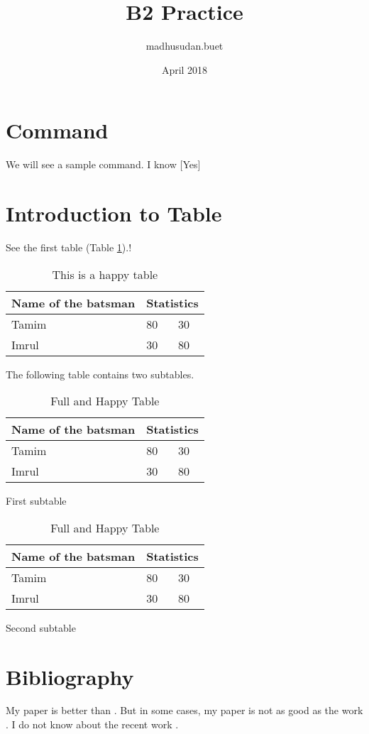 \documentclass{article}
\title{B2 Practice}
\author{madhusudan.buet }
\date{April 2018}
\begin{document}
\maketitle
\listoftables
\section{Command}
We will see a sample command. I know [Yes]
\section{Introduction to Table}
See the first table (Table \ref{tab:1}).! \newline
\begin{table}[h!]
\centering
\begin{tabular}{|| m{2cm} | m{2cm} | m{3cm} ||}
\hline
   Name of the batsman & \multicolumn{2}{c|}{Statistics}\\
   \hline
   \hline
   Tamim & 80 & 30\\
   \hline
   Imrul & 30 & 80\\
   \hline
\end{tabular}
\caption{This is a happy table}
\label{tab:1}
\end{table}

The following table contains two subtables. 
\begin{table}[]
\centering
    \begin{subtable}{0.7\textwidth}
    \centering
        \begin{tabular}{|| m{2cm} | m{2cm} | m{3cm} ||}
            \hline
            Name of the batsman & \multicolumn{2}{c|}{Statistics}\\
            \hline
           \hline
           Tamim & 80 & 30\\
           \hline
           Imrul & 30 & 80\\
           \hline
        \end{tabular}
        \caption{First subtable}
        \label{subtab:1}
    \end{subtable}
    \begin{subtable}{0.7\textwidth}
        \begin{tabular}{|| m{2cm} | m{2cm} | m{3cm} ||}
            \hline
            Name of the batsman & \multicolumn{2}{c|}{Statistics}\\
            \hline
           \hline
           Tamim & 80 & 30\\
           \hline
           Imrul & 30 & 80\\
           \hline
        \end{tabular}
        \caption{Second subtable}
        \label{subtab:2}
    \end{subtable}
    \caption{Full and Happy Table}
    \label{tab:2}
\end{table}

\section{Bibliography}
My paper is better than \cite{Han:2000}. But in some cases, my paper is not as good as the work \cite{Pei:2000}. I do not know about the recent work \cite{Aditya:2017}.

%
%

\printbibliography
\end{document}
